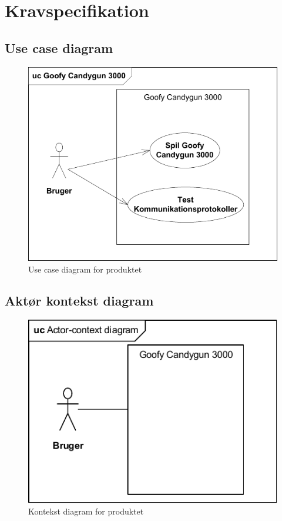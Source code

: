 
\chapter{Kravspecifikation}
\section{Use case diagram}
\begin{figure}[H]
	\centering
	\includegraphics[]{Kravspecifikation/images/usecaseDiagram}
	\caption{Use case diagram for produktet}
	\label{ref:usecaseDiagram}
\end{figure}


\section{Aktør kontekst diagram}
\begin{figure}[H]
	\centering
	\includegraphics[]{Kravspecifikation/images/kontekstDiagram}
	\caption{Kontekst diagram for produktet}
	\label{ref:kontekstDiagram}
\end{figure}

